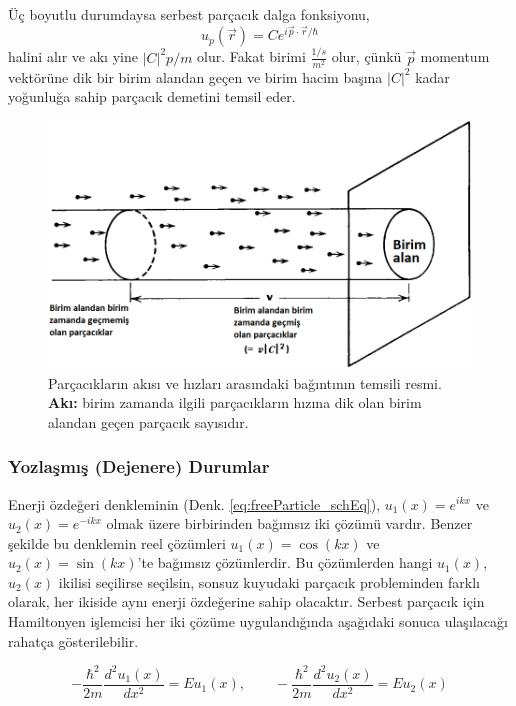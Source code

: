 \documentclass[a4paper,12pt, twoside]{article}
\begin{document}
\begin{enumerate}
	Üç boyutlu durumdaysa serbest parçacık dalga fonksiyonu,
	\begin{equation}
	u _ { p } ( \vec{ r } ) = C e ^ { i \vec { p } \cdot \vec { r } / \hbar }
	\end{equation}
	halini alır ve akı yine $|C|^2 p/m$ olur. Fakat birimi $\frac{1/s}{m^2}$ olur, çünkü $\vec p$ momentum vektörüne dik bir birim alandan geçen ve birim hacim başına $|C|^2$ kadar yoğunluğa sahip parçacık demetini temsil eder.
	\begin{figure}[hbtp]
		\centering
		\includegraphics[width=0.7\linewidth]{figurler/normalization_and_probab_flux}
		\caption{Parçacıkların akısı ve hızları arasındaki bağıntının temsili resmi. {\bf Akı:} birim zamanda ilgili parçacıkların hızına dik olan birim alandan geçen parçacık sayısıdır.}
		\label{fig:normalizationandprobabflux}
	\end{figure}
	
	
	
\end{enumerate}

\subsubsection{Yozlaşmış (Dejenere) Durumlar}

Enerji özdeğeri denkleminin (Denk. \ref{eq:freeParticle_schEq}), $u_1(x) = e^{i k x}$ ve $u_2(x) = e^{-i k x}$  olmak üzere birbirinden bağımsız iki çözümü vardır. Benzer şekilde bu denklemin reel çözümleri $u_1(x) = \cos(kx)$ ve $u_2(x) = \sin(kx)$'te bağımsız çözümlerdir. Bu çözümlerden hangi $u_1(x)$, $u_2(x)$ ikilisi seçilirse seçilsin, sonsuz kuyudaki parçacık probleminden farklı olarak, her ikiside aynı enerji özdeğerine sahip olacaktır. Serbest parçacık için Hamiltonyen işlemcisi her iki çözüme uygulandığında aşağıdaki sonuca ulaşılacağı rahatça gösterilebilir.

\begin{equation}
-\frac{ \hbar ^ { 2 } } { 2 m} \frac { d ^ { 2 } u_1 ( x ) } { d x ^ { 2 } }  =  E u_1 ( x ), \quad\quad
-\frac{ \hbar ^ { 2 } } { 2 m} \frac { d ^ { 2 } u_2 ( x ) } { d x ^ { 2 } }  =  E u_2 ( x )
\end{equation}
\end{document}
